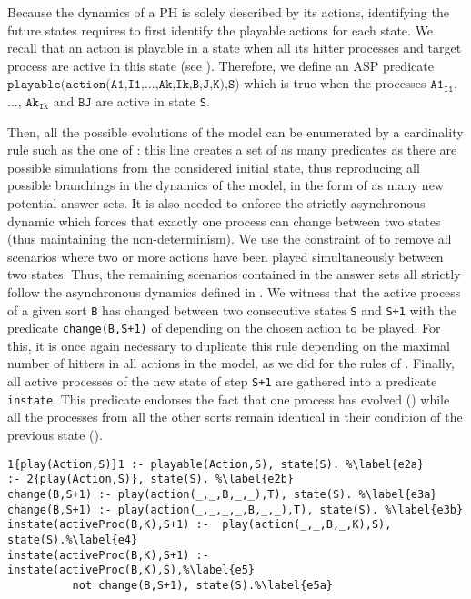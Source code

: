 Because the dynamics of a PH is solely described by its actions, identifying the future states requires to first identify the playable actions for each state.
We recall that an action is playable in a state when all its hitter processes and target process are active in this state (see ).
Therefore, we define an ASP predicate $\texttt{playable(action(A1,I1,...,Ak,Ik,B,J,K),S)}$ which is true when the processes $\texttt{A1}_{\texttt{I1}}$, ..., $\texttt{Ak}_{\texttt{Ik}}$ and $\texttt{BJ}$ are active in state \texttt{S}.

Then, all the possible evolutions of the model can be enumerated by a cardinality rule such as the one of :
this line creates a set of as many predicates as there are possible simulations from the considered initial state,
thus reproducing all possible branchings in the dynamics of the model, in the form of as many new potential answer sets.
It is also needed to enforce the strictly asynchronous dynamic
which forces that exactly one process can change between two states (thus maintaining the non-determinism).
We use the constraint of  to remove all scenarios where two or more actions have been played simultaneously between two states.
Thus, the remaining scenarios contained in the answer sets all strictly follow
the asynchronous dynamics defined in .
We witness that the active process of a given sort \texttt{B} has changed between two consecutive states \texttt{S} and \texttt{S+1} with the predicate \texttt{change(B,S+1)} of 
depending on the chosen action to be played.
For this, it is once again necessary to duplicate this rule depending on the maximal number of hitters in all actions in the model,
as we did for the rules of .
Finally, all active processes of the new state of step \texttt{S+1}
are gathered into a predicate \texttt{instate}.
This predicate endorses the fact that one process has evolved ()
while all the processes from all the other sorts
remain identical in their condition of the previous state ().

\begin{lstlisting}
1{play(Action,S)}1 :- playable(Action,S), state(S). %\label{e2a} 
:- 2{play(Action,S)}, state(S). %\label{e2b}
change(B,S+1) :- play(action(_,_,B,_,_),T), state(S). %\label{e3a}
change(B,S+1) :- play(action(_,_,_,_,B,_,_),T), state(S). %\label{e3b}
instate(activeProc(B,K),S+1) :-  play(action(_,_,B,_,K),S), state(S).%\label{e4}
instate(activeProc(B,K),S+1) :-  instate(activeProc(B,K),S),%\label{e5}
          not change(B,S+1), state(S).%\label{e5a}
\end{lstlisting}

